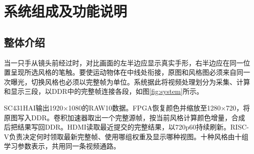 \section{系统组成及功能说明}
\subsection{整体介绍}
当一只手从镜头前经过时，对比画面的左半边应显示真实手形，右半边应在同一位置呈现所选风格的笔触。要使运动物体在中线处衔接，原图和风格图必须来自同一次曝光，切换风格也必须以完整帧为单位。系统据此将视频处理划分为采集、计算和显示三段，以DDR中的完整帧连接各段，如图\ref{fig:system}所示。

SC431HAI输出1920×1080的RAW10数据。FPGA恢复颜色并缩放至1280×720，将原图写入DDR。卷积加速器取出一个完整源帧，按当前风格计算颜色增量，合成后把结果写回DDR。HDMI读取最近提交的完整结果，以720p60持续刷新。RISC-V负责决定何时领取最新完整帧、使用哪组权重及显示哪种视图。十种风格由十组学习参数表示，共用同一条视频通路。
